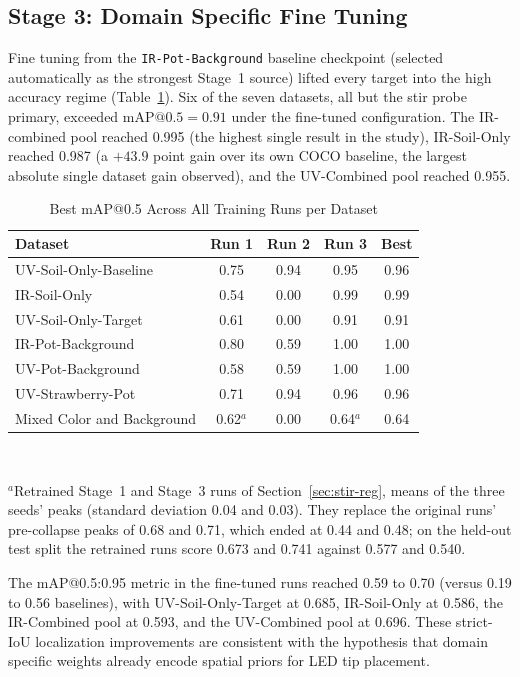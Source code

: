 ﻿\documentclass[journal]{IEEEtran}
\begin{document}
\subsection{Stage 3: Domain Specific Fine Tuning}
Fine tuning from the \texttt{IR-Pot-Background} baseline checkpoint (selected automatically as the strongest Stage~1 source) lifted every target into the high accuracy regime (Table~\ref{tab:best}). Six of the seven datasets, all but the stir probe primary, exceeded $\text{mAP@0.5}=0.91$ under the fine-tuned configuration. The IR-combined pool reached 0.995 (the highest single result in the study), IR-Soil-Only reached 0.987 (a $+43.9$ point gain over its own COCO baseline, the largest absolute single dataset gain observed), and the UV-Combined pool reached 0.955.

\begin{table}[!t]
\renewcommand{\arraystretch}{1.3}
\caption{Best mAP@0.5 Across All Training Runs per Dataset}
\label{tab:best}
\centering
\begin{tabular}{l c c c c}
\toprule
\textbf{Dataset} & \textbf{Run 1} & \textbf{Run 2} & \textbf{Run 3} & \textbf{Best} \\
\midrule
UV-Soil-Only-Baseline & 0.75 & 0.94 & 0.95 & 0.96 \\
IR-Soil-Only & 0.54 & 0.00 & 0.99 & 0.99 \\
UV-Soil-Only-Target & 0.61 & 0.00 & 0.91 & 0.91 \\
IR-Pot-Background & 0.80 & 0.59 & 1.00 & 1.00 \\
UV-Pot-Background & 0.58 & 0.59 & 1.00 & 1.00 \\
UV-Strawberry-Pot & 0.71 & 0.94 & 0.96 & 0.96 \\
Mixed Color and Background & 0.62$^{a}$ & 0.00 & 0.64$^{a}$ & 0.64 \\
\bottomrule
\end{tabular}
\\[2pt]
\parbox{\columnwidth}{\footnotesize $^{a}$Retrained Stage~1 and Stage~3 runs of Section~\ref{sec:stir-reg}, means of the three seeds' peaks (standard deviation 0.04 and 0.03). They replace the original runs' pre-collapse peaks of 0.68 and 0.71, which ended at 0.44 and 0.48; on the held-out test split the retrained runs score 0.673 and 0.741 against 0.577 and 0.540.}
\end{table}

The mAP@0.5:0.95 metric in the fine-tuned runs reached 0.59 to 0.70 (versus 0.19 to 0.56 baselines), with UV-Soil-Only-Target at 0.685, IR-Soil-Only at 0.586, the IR-Combined pool at 0.593, and the UV-Combined pool at 0.696. These strict-IoU localization improvements are consistent with the hypothesis that domain specific weights already encode spatial priors for LED tip placement.
\end{document}
